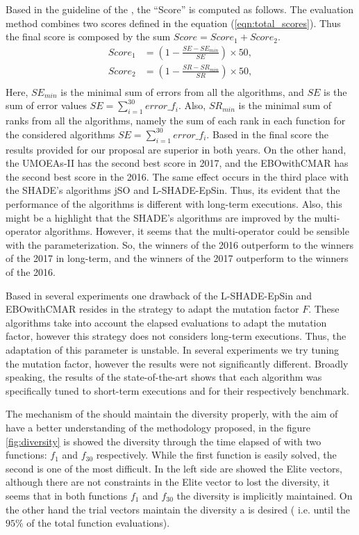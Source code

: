 Based in the guideline of the \CEC{}, the ``Score'' is computed as follows.
%
The evaluation method combines two scores defined in the equation (\ref{eqn:total_scores}).
%
Thus the final score is composed by the sum $Score = Score_1 + Score_2$.
%
\begin{equation}\label{eqn:total_scores}
\begin{split}
Score_1 &= \left (1 - \frac{SE - SE_{min}}{SE} \right) \times 50, \\
Score_2 &= \left  (1 - \frac{SR - SR_{min}}{SR} \right ) \times 50, \\
\end{split}
\end{equation}
Here, $SE_{min}$ is the minimal sum of errors from all the algorithms, and $SE$ is the sum of error values $SE = \sum_{i=1}^{30} error\_f_i$.
%
Also, $SR_{min}$ is the minimal sum of ranks from all the algorithms, namely the sum of each rank in each function for the considered algorithms $SE = \sum_{i=1}^{30} error\_f_i$.
%
Based in the final score the results provided for our proposal are superior in both years.
%
On the other hand, the UMOEAs-II has the second best score in \CEC{} 2017, and the EBOwithCMAR has the second best score in the \CEC{} 2016.
%
The same effect occurs in the third place with the SHADE's algorithms jSO and L-SHADE-EpSin.
%
Thus, its evident that the performance of the algorithms is different with long-term executions.
%
Also, this might be a highlight that the SHADE's algorithms are improved by the multi-operator algorithms.
%
However, it seems that the multi-operator could be sensible with the parameterization.
%
So, the winners of the \CEC{} 2016 outperform to the winners of the \CEC{} 2017 in long-term, and the winners of the \CEC{} 2017 outperform to the winners of the \CEC{} 2016.
%


Based in several experiments one drawback of the L-SHADE-EpSin and EBOwithCMAR resides in the strategy to adapt the mutation factor $F$.
%
These algorithms take into account the elapsed evaluations to adapt the mutation factor, however this strategy does not considers long-term executions.
%
Thus, the adaptation of this parameter is unstable.
%
In several experiments we try tuning the mutation factor, however the results were not significantly different. 
%
Broadly speaking, the results of the state-of-the-art shows that each algorithm was specifically tuned to short-term executions and for their respectively benchmark.
%

The mechanism of the \DEEDM{} should maintain the diversity properly, with the aim of have a better understanding of the methodology proposed, in the figure \ref{fig:diversity} is showed the diversity through the time elapsed of \DEEDM{} with two functions: $f_1$ and $f_{30}$ respectively.
%
While the first function is easily solved, the second is one of the most difficult.
%
In the left side are showed the Elite vectors, although there are not constraints in the Elite vector to lost the diversity, it seems that in both functions $f_1$ and $f_{30}$ the diversity is implicitly maintained.
%
On the other hand the trial vectors maintain the diversity a is desired ( i.e. until the $95\%$ of the total function evaluations).

